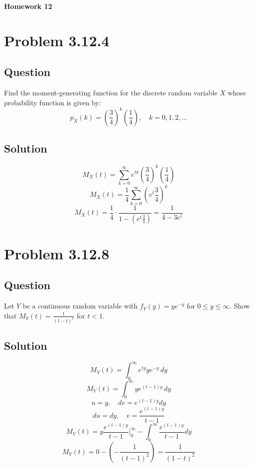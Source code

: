 \documentclass[12pt]{article}
\begin{document}
\begin{center}
  \Large \textbf{Homework 12}
\end{center}

\section*{Problem 3.12.4}
\subsection*{Question}
Find the moment-generating function for the discrete random variable \(X\) whose probability function is given by:
\[
  p_X(k) = \left(\frac{3}{4}\right)^k \left(\frac{1}{4}\right), \quad k=0,1,2,\dots
\]

\subsection*{Solution}
\[
  M_X(t) = \sum_{k=0}^\infty e^{tk} \left(\frac{3}{4}\right)^k \left(\frac{1}{4}\right)
\]
\[
  M_X(t) = \frac{1}{4} \sum_{k=0}^\infty \left(e^t \frac{3}{4}\right)^k
\]
\[
  M_X(t) = \frac{1}{4} \cdot \frac{1}{1 - \left(e^t \frac{3}{4}\right)} = \frac{1}{4 - 3e^t}
\]
\pagebreak

\section*{Problem 3.12.8}
\subsection*{Question}
Let \(Y\) be a continuous random variable with \(f_Y(y) = ye^{-y}\) for \(0 \leq y \leq \infty\). Show that \(M_Y(t) = \frac{1}{(1-t)^2}\) for \(t < 1\).

\subsection*{Solution}
\[
  M_Y(t) = \int_0^\infty e^{ty} y e^{-y} \, dy
\]
\[
  M_Y(t) = \int_0^\infty y e^{(t-1)y} \, dy
\]
\[
  u = y, \quad dv = e^{(t-1)y} dy
\]
\[
  du = dy, \quad v = \frac{e^{(t-1)y}}{t-1}
\]
\[
  M_Y(t) = y \frac{e^{(t-1)y}}{t-1} \bigg|_0^\infty - \int_0^\infty \frac{e^{(t-1)y}}{t-1} dy
\]
\[
  M_Y(t) = 0 - \left(-\frac{1}{(t-1)^2}\right) = \frac{1}{(1-t)^2}
\]
\pagebreak
\end{document}
